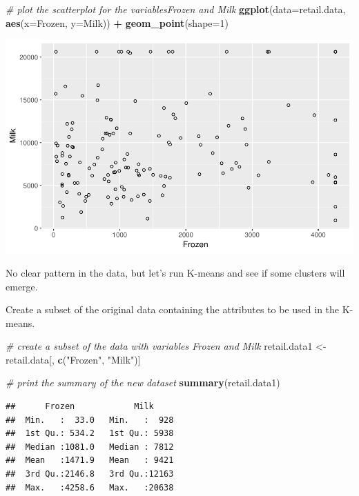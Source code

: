 \documentclass[]{article}
\newenvironment{Shaded}{\begin{snugshade}}{\end{snugshade}}
\newcommand{\KeywordTok}[1]{\textcolor[rgb]{0.13,0.29,0.53}{\textbf{#1}}}
\newcommand{\DataTypeTok}[1]{\textcolor[rgb]{0.13,0.29,0.53}{#1}}
\newcommand{\DecValTok}[1]{\textcolor[rgb]{0.00,0.00,0.81}{#1}}
\newcommand{\StringTok}[1]{\textcolor[rgb]{0.31,0.60,0.02}{#1}}
\newcommand{\CommentTok}[1]{\textcolor[rgb]{0.56,0.35,0.01}{\textit{#1}}}
\newcommand{\OperatorTok}[1]{\textcolor[rgb]{0.81,0.36,0.00}{\textbf{#1}}}
\newcommand{\NormalTok}[1]{#1}
\begin{document}
\begin{Shaded}
\begin{Highlighting}[]
\CommentTok{# plot the scatterplot for the variablesFrozen and Milk}
\KeywordTok{ggplot}\NormalTok{(}\DataTypeTok{data=}\NormalTok{retail.data, }\KeywordTok{aes}\NormalTok{(}\DataTypeTok{x=}\NormalTok{Frozen, }\DataTypeTok{y=}\NormalTok{Milk)) }\OperatorTok{+}\StringTok{ }
\StringTok{  }\KeywordTok{geom_point}\NormalTok{(}\DataTypeTok{shape=}\DecValTok{1}\NormalTok{)}
\end{Highlighting}
\end{Shaded}

\begin{center}\includegraphics{7._K-means_Clustering_files/figure-latex/unnamed-chunk-21-1} \end{center}

No clear pattern in the data, but let's run K-means and see if some
clusters will emerge.

Create a subset of the original data containing the attributes to be
used in the K-means.

\begin{Shaded}
\begin{Highlighting}[]
\CommentTok{# create a subset of the data with variables Frozen and Milk}
\NormalTok{retail.data1 <-}\StringTok{ }\NormalTok{retail.data[, }\KeywordTok{c}\NormalTok{(}\StringTok{"Frozen"}\NormalTok{, }\StringTok{"Milk"}\NormalTok{)]}

\CommentTok{# print the summary of the new dataset}
\KeywordTok{summary}\NormalTok{(retail.data1)}
\end{Highlighting}
\end{Shaded}

\begin{verbatim}
##      Frozen            Milk      
##  Min.   :  33.0   Min.   :  928  
##  1st Qu.: 534.2   1st Qu.: 5938  
##  Median :1081.0   Median : 7812  
##  Mean   :1471.9   Mean   : 9421  
##  3rd Qu.:2146.8   3rd Qu.:12163  
##  Max.   :4258.6   Max.   :20638
\end{verbatim}
\end{document}
